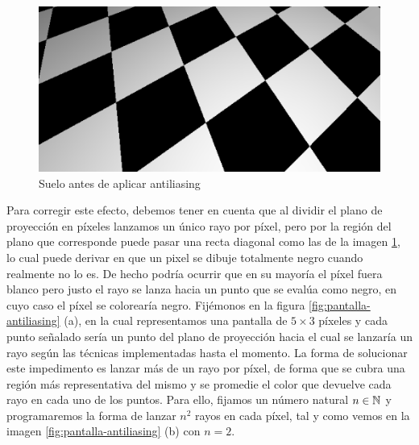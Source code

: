 \begin{figure} [ht]
    \centering
    \includegraphics[scale = 0.5]{img/C8/no-antiliasing.png}
    \caption{Suelo antes de aplicar antiliasing}
    \label{fig:no-antiliasing}
\end{figure}

Para corregir este efecto, debemos tener en cuenta que al dividir el plano de proyección en píxeles lanzamos un único rayo por píxel, pero por la región del plano que corresponde puede pasar una recta diagonal como las de la imagen \ref{fig:no-antiliasing}, lo cual puede derivar en que un pixel se dibuje totalmente negro cuando realmente no lo es. De hecho podría ocurrir que en su mayoría el píxel fuera blanco pero justo el rayo se lanza hacia un punto que se evalúa como negro, en cuyo caso el píxel se colorearía negro. Fijémonos en la figura \ref{fig:pantalla-antiliasing} (a), en la cual representamos una pantalla de $5\times 3$ píxeles y cada punto señalado sería un punto del plano de proyección hacia el cual se lanzaría un rayo según las técnicas implementadas hasta el momento. La forma de solucionar este impedimento es lanzar más de un rayo por píxel, de forma que se cubra una región más representativa del mismo y se promedie el color que devuelve cada rayo en cada uno de los puntos. Para ello, fijamos un número natural $n\in\mathbb{N}$ y programaremos la forma de lanzar $n^2$ rayos en cada píxel, tal y como vemos en la imagen \ref{fig:pantalla-antiliasing} (b) con $n=2$.

